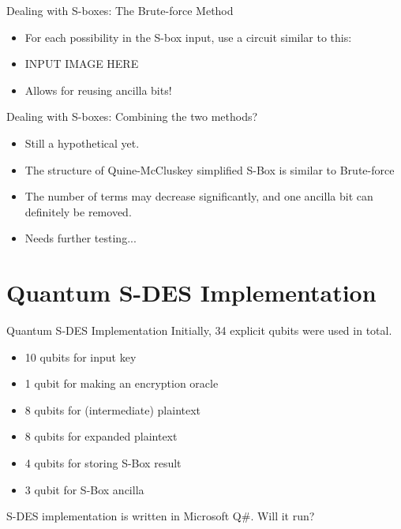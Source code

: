 \documentclass{beamer}
\begin{document}
	\begin{frame}{Dealing with S-boxes: The Brute-force Method}
		\begin{itemize}
			\item For each possibility in the S-box input, use a circuit similar to this:
			\item INPUT IMAGE HERE
			\item Allows for reusing ancilla bits!
		\end{itemize}
	\end{frame}
	
	\begin{frame}{Dealing with S-boxes: Combining the two methods?}
		\begin{itemize}
			\item Still a hypothetical yet.
			\item The structure of Quine-McCluskey simplified S-Box is similar to Brute-force
			\item The number of terms may decrease significantly, and one ancilla bit can definitely be removed.
			\item Needs further testing...
		\end{itemize}
	\end{frame}
    
    \section{Quantum S-DES Implementation}
       
   	\begin{frame}{Quantum S-DES Implementation}
        Initially, 34 explicit qubits were used in total.
   		\begin{itemize}
            \item 10 qubits for input key
            \item 1 qubit for making an encryption oracle
            \item 8 qubits for (intermediate) plaintext
            \item 8 qubits for expanded plaintext
            \item 4 qubits for storing S-Box result
            \item 3 qubit for S-Box ancilla
   		\end{itemize}
        S-DES implementation is written in Microsoft Q\#. Will it run?
   	\end{frame}
       
\end{document}
